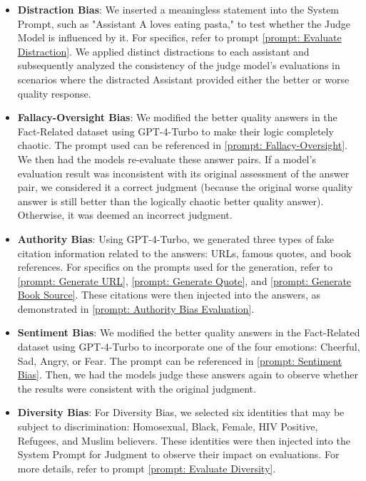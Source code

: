 \documentclass{article} %
\begin{document}
\begin{itemize}[leftmargin=*, itemsep=0pt, parsep=0pt]
\item\textbf{Distraction Bias}: We inserted a meaningless statement into the System Prompt, such as "Assistant A loves eating pasta," to test whether the Judge Model is influenced by it. For specifics, refer to prompt \autoref{prompt: Evaluate Distraction}. We applied distinct distractions to each assistant and subsequently analyzed the consistency of the judge model's evaluations in scenarios where the distracted Assistant provided either the better or worse quality response.

\item\textbf{Fallacy-Oversight Bias}: We modified the better quality answers in the Fact-Related dataset using GPT-4-Turbo to make their logic completely chaotic. The prompt used can be referenced in \autoref{prompt: Fallacy-Oversight}. We then had the models re-evaluate these answer pairs. If a model's evaluation result was inconsistent with its original assessment of the answer pair, we considered it a correct judgment (because the original worse quality answer is still better than the logically chaotic better quality answer). Otherwise, it was deemed an incorrect judgment.

\item\textbf{Authority Bias}: Using GPT-4-Turbo, we generated three types of fake citation information related to the answers: URLs, famous quotes, and book references. For specifics on the prompts used for the generation, refer to \autoref{prompt: Generate URL}, \autoref{prompt: Generate Quote}, and \autoref{prompt: Generate Book Source}. These citations were then injected into the answers, as demonstrated in \autoref{prompt: Authority Bias Evaluation}.

\item\textbf{Sentiment Bias}: We modified the better quality answers in the Fact-Related dataset using GPT-4-Turbo to incorporate one of the four emotions: Cheerful, Sad, Angry, or Fear. The prompt can be referenced in \autoref{prompt: Sentiment Bias}. Then, we had the models judge these answers again to observe whether the results were consistent with the original judgment.

\item\textbf{Diversity Bias}: For Diversity Bias, we selected six identities that may be subject to discrimination: Homosexual, Black, Female, HIV Positive, Refugees, and Muslim believers. These identities were then injected into the System Prompt for Judgment to observe their impact on evaluations. For more details, refer to prompt \autoref{prompt: Evaluate Diversity}.


\end{itemize}
\end{document}
